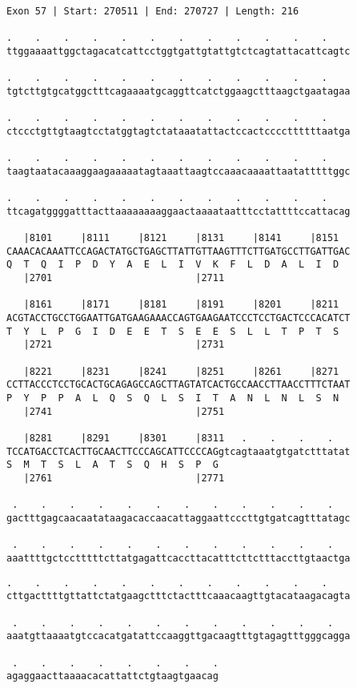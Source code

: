 \documentclass{article}
\begin{document}
\begin{Verbatim}[fontfamily=courier]
Exon 57 | Start: 270511 | End: 270727 | Length: 216

.    .    .    .    .    .    .    .    .    .    .    .    
ttggaaaattggctagacatcattcctggtgattgtattgtctcagtattacattcagtc

.    .    .    .    .    .    .    .    .    .    .    .    
tgtcttgtgcatggctttcagaaaatgcaggttcatctggaagctttaagctgaatagaa

.    .    .    .    .    .    .    .    .    .    .    .    
ctccctgttgtaagtcctatggtagtctataaatattactccactccccttttttaatga

.    .    .    .    .    .    .    .    .    .    .    .    
taagtaatacaaaggaagaaaaatagtaaattaagtccaaacaaaattaatatttttggc

.    .    .    .    .    .    .    .    .    .    .    .    
ttcagatggggatttacttaaaaaaaaggaactaaaataatttcctattttccattacag

   |8101     |8111     |8121     |8131     |8141     |8151  
CAAACACAAATTCCAGACTATGCTGAGCTTATTGTTAAGTTTCTTGATGCCTTGATTGAC
Q  T  Q  I  P  D  Y  A  E  L  I  V  K  F  L  D  A  L  I  D  
   |2701                         |2711                      

   |8161     |8171     |8181     |8191     |8201     |8211  
ACGTACCTGCCTGGAATTGATGAAGAAACCAGTGAAGAATCCCTCCTGACTCCCACATCT
T  Y  L  P  G  I  D  E  E  T  S  E  E  S  L  L  T  P  T  S  
   |2721                         |2731                      

   |8221     |8231     |8241     |8251     |8261     |8271  
CCTTACCCTCCTGCACTGCAGAGCCAGCTTAGTATCACTGCCAACCTTAACCTTTCTAAT
P  Y  P  P  A  L  Q  S  Q  L  S  I  T  A  N  L  N  L  S  N  
   |2741                         |2751                      

   |8281     |8291     |8301     |8311   .    .    .    .   
TCCATGACCTCACTTGCAACTTCCCAGCATTCCCCAGgtcagtaaatgtgatctttatat
S  M  T  S  L  A  T  S  Q  H  S  P  G                       
   |2761                         |2771                      

 .    .    .    .    .    .    .    .    .    .    .    .   
gactttgagcaacaatataagacaccaacattaggaattcccttgtgatcagtttatagc

 .    .    .    .    .    .    .    .    .    .    .    .   
aaattttgctcctttttcttatgagattcaccttacatttcttctttaccttgtaactga

\end{Verbatim}
\newpage
\begin{Verbatim}[fontfamily=courier]
 .    .    .    .    .    .    .    .    .    .    .    .   
cttgacttttgttattctatgaagctttctactttcaaacaagttgtacataagacagta

 .    .    .    .    .    .    .    .    .    .    .    .   
aaatgttaaaatgtccacatgatattccaaggttgacaagtttgtagagtttgggcagga

 .    .    .    .    .    .    .    .
agaggaacttaaaacacattattctgtaagtgaacag
\end{Verbatim}
\end{document}
